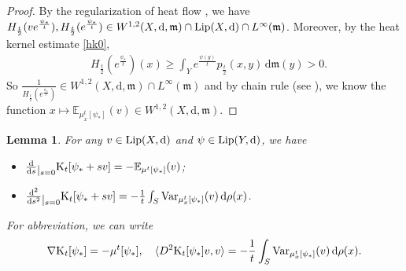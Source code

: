 \documentclass[a4paper,11pt]{article}
\numberwithin{equation}{section}
\theoremstyle{plain}
\newtheorem{lemma}[theorem]{Lemma}
\theoremstyle{definition}
\theoremstyle{remark}
\newcommand{\mm}{\mathfrak m}
\newcommand{\E}{\mathbb{E}}
\newcommand{\K}{\mathrm{K}}
\newcommand{\Lip}{\mathop{\rm Lip}\nolimits}
\renewcommand{\d}{{\mathrm d}}
\newcommand{\restr}[1]{\lower3pt\hbox{$|_{#1}$}}
\begin{document}
\begin{proof}
		By the regularization of heat flow  \cite[Theorem 6.5]{zbMATH06303881}, we have $H_\frac{t}{2}(v e^\frac{\psi_*}{t}), H_\frac{t}{2}(e^\frac{\psi_*}{t})\in W^{1,2}(X,\d,\mm)\cap \Lip(X,\d)\cap L^\infty(\mm)$. Moreover, by the heat kernel estimate \eqref{hk0},
		\begin{equation}\label{3.15}
			\begin{aligned}
				&H_\frac{t}{2}(e^\frac{\psi_*}{t})(x)
				\geq \int_{Y} e^{\frac{\psi(y)}{t}} p_\frac{t}{2}(x,y)\,\d\mm(y)>0.
			\end{aligned}
		\end{equation}
	So $\frac{1}{H_\frac{t}{2}(e^\frac{\psi_*}{t})}\in W^{1,2}(X,\d,\mm)\cap L^\infty(\mm)$ and by chain rule  (see \cite[Theorem 4.3.3]{zbMATH07183685}), we know the function  $x\mapsto \E_{\mu_x^t[\psi_*]}(v)\in W^{1,2}(X,\d,\mm)$.
	\end{proof}
		
\medskip

	\begin{lemma}\label{lemma0.3}
		For any $v\in\Lip(X,\d)$ and $\psi\in \Lip(Y,  \d)$, we have 
		\begin{itemize}
		\item  $\frac{\d}{\d s}\restr{s=0}{\K}_t[\psi_*+sv]=-  \E_{\mu^t[\psi_*]}(v)$;
		\item $\frac{\d^2}{\d s^2}\restr{s=0}{\K}_t[\psi_*+sv]=-\frac{1}{t}\int_S {\rm{Var}}_{ \mu_x^t[\psi_*]}(v)\,\d\rho(x)$.
		
		\end{itemize}
		
	For abbreviation,  we  can write
		$$\nabla {\K}_t[\psi_*]=- \mu^t[\psi_*],\quad  \langle D^2{\K}_t[\psi_*]v, v\rangle=-\frac{1}{t}\int_S {\rm{Var}}_{ \mu_x^t[\psi_*]}(v)\,\d\rho(x).$$
	\end{lemma}
	
\end{document}

